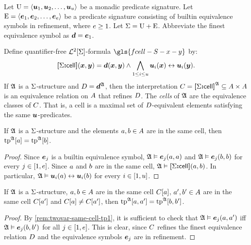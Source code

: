 
Let $\mathrm{U} = \left\langle \bm{u}_{1},\bm{u}_{2},\dots,\bm{u}_{u} \right\rangle$ be a monadic predicate signature.
Let $\mathrm{E} = \left\langle \bm{e}_{1},\bm{e}_{2},\dots,\bm{e}_{e} \right\rangle$ be a predicate signature consisting
of builtin equivalence symbols in refinement, where $e \geq 1$.
Let $\mathrm{\Sigma} = \mathrm{U} + \mathrm{E}$.
Abbreviate the finest equivalence symbol as $\bm{d} = \bm{e}_{1}$.
\begin{definition}
Define quantifier-free $\mathcal{L}^{2}[\mathrm{\Sigma}]$-formula $\gls{fcell-S-x-y}$ by:
\[
  {\bm{[}\mathrm{\Sigma}\mathord{\bm{:}}\mathsf{cell}\bm{]}}(\bm{x},\bm{y}) = \bm{d}(\bm{x},\bm{y}) \land
  \bigwedge_{1 \leq i \leq u} \bm{u}_{i}(\bm{x}) \leftrightarrow \bm{u}_{i}(\bm{y}).
\]
If $\mathfrak{A}$ is a $\mathrm{\Sigma}$-structure and $D = \bm{d}^{\mathfrak{A}}$, then the
interpretation $C = {\bm{[}\mathrm{\Sigma}\mathord{\bm{:}}\mathsf{cell}\bm{]}}^{\mathfrak{A}} \subseteq {A\times A}$ is an
equivalence relation on $A$ that refines $D$.
The \emph{cells} of $\mathfrak{A}$ are the equivalence classes of $C$.
That is, a cell is a maximal set of $D$-equivalent elements satisfying the
same $\bm{u}$-predicates.
\end{definition}

\begin{remark}\label{rem:twovar-same-cell-tp1}
If $\mathfrak{A}$ is a $\mathrm{\Sigma}$-structure and the elements $a, b \in A$ are in
the same cell, then $\operatorname{tp}^{\mathfrak{A}}[a] = \operatorname{tp}^{\mathfrak{A}}[b]$.
\end{remark}
\begin{proof}
Since $\bm{e}_{j}$ is a builtin equivalence symbol,
$\mathfrak{A} \vDash \bm{e}_{j}(a,a)$ and $\mathfrak{A} \vDash \bm{e}_{j}(b,b)$
for every $j \in [1,e]$.
Since $a$ and $b$ are in the same cell,
$\mathfrak{A} \vDash {\bm{[}\mathrm{\Sigma}\mathord{\bm{:}}\mathsf{cell}\bm{]}}(a,b)$.
In particular, $\mathfrak{A} \vDash \bm{u}_{i}(a) \leftrightarrow \bm{u}_{i}(b)$ for every
$i \in [1,u]$.
\end{proof}
\begin{remark}\label{rem:twovar-same-cell-tp2}
If $\mathfrak{A}$ is a $\mathrm{\Sigma}$-structure, $a, b \in A$ are in the same cell
$C[a]$, ${a'}, {b'} \in A$ are in the same cell $C[{a'}]$ and
$C[a] \neq C[{a'}]$,
then $\operatorname{tp}^{\mathfrak{A}}[a,{a'}] = \operatorname{tp}^{\mathfrak{A}}[b,{b'}]$.
\end{remark}
\begin{proof}
By \cref{rem:twovar-same-cell-tp1}, it is sufficient to check that
$\mathfrak{A} \vDash \bm{e}_{j}(a, {a'})$ iff $\mathfrak{A} \vDash \bm{e}_{j}(b, {b'})$
for all $j \in [1,e]$.
This is clear, since $C$ refines the finest equivalence relation $D$ and
the equivalence symbols $\bm{e}_{j}$ are in refinement.
\end{proof}

